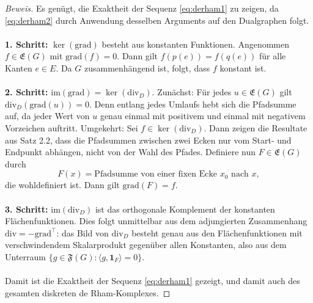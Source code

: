 \documentclass[11pt,a4paper,leqno]{report}
\numberwithin{equation}{chapter}
\begin{document}
\begin{proof}[Beweis]
	Es genügt, die Exaktheit der Sequenz \eqref{eq:derham1} zu zeigen, 
	da \eqref{eq:derham2} durch Anwendung desselben Arguments auf den Dualgraphen folgt.\\
	\\
	\medskip\noindent
	\textbf{1. Schritt:} $\ker(\mathrm{grad})$ besteht aus konstanten Funktionen.  
	Angenommen $f\in\mathfrak{E}(G)$ mit $\mathrm{grad}(f)=0$. 
	Dann gilt $f(p(e))=f(q(e))$ für alle Kanten $e\in E$. 
	Da $G$ zusammenhängend ist, folgt, dass $f$ konstant ist.  \\
	\\
	\medskip\noindent
	\textbf{2. Schritt:} $\mathrm{im}(\mathrm{grad}) = \ker(\mathrm{div}_D)$.  
	Zunächst: Für jedes $u \in \mathfrak{E}(G)$ gilt $\mathrm{div}_D(\mathrm{grad}(u))=0$.  
	Denn entlang jedes Umlaufs hebt sich die Pfadsumme auf, da jeder Wert von $u$ 
	genau einmal mit positivem und einmal mit negativem Vorzeichen auftritt.  
	Umgekehrt: Sei $f \in \ker(\mathrm{div}_D)$. 
	Dann zeigen die Resultate aus Satz 2.2, dass die Pfadsummen zwischen zwei Ecken nur vom Start- und Endpunkt abhängen, nicht von der Wahl des Pfades. 
	Definiere nun $F\in \mathfrak{E}(G)$ durch 
	\[
	F(x) = \text{Pfadsumme von einer fixen Ecke $x_0$ nach $x$},
	\]
	die wohldefiniert ist. Dann gilt $\mathrm{grad}(F)=f$.  \\
	\\
	\medskip\noindent
	\textbf{3. Schritt:} $\mathrm{im}(\mathrm{div}_D)$ ist das orthogonale Komplement der konstanten Flächenfunktionen.  
	Dies folgt unmittelbar aus dem adjungierten Zusammenhang $\mathrm{div} = -\mathrm{grad}^\top$: 
	das Bild von $\mathrm{div}_D$ besteht genau aus den Flächenfunktionen mit verschwindendem Skalarprodukt 
	gegenüber allen Konstanten, also aus dem Unterraum $\{g\in \mathfrak{F}(G): \langle g, \mathbf{1}_F\rangle =0\}$.\\
	\\
	\medskip
	Damit ist die Exaktheit der Sequenz \eqref{eq:derham1} gezeigt,
	und damit auch des gesamten diskreten de Rham-Komplexes.
\end{proof}
\end{document}
